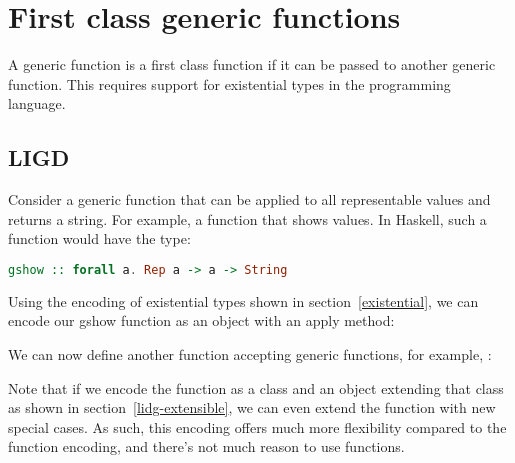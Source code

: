 \section{First class generic functions}

A generic function is a first class function if it can be passed to another
generic function. This requires support for existential types in the programming
language.

\subsection{LIGD}

Consider a generic function that can be applied to all representable values
and returns a string. For example, a function  that shows values.
In Haskell, such a function would have the type:
\begin{lstlisting}[language=Haskell]
gshow :: forall a. Rep a -> a -> String
\end{lstlisting}

Using the encoding of existential types shown in section~\ref{existential},
we can encode our gshow function as an object with an apply method:

We can now define another function accepting generic functions, for example, :


Note that if we encode the function as a class and an object extending that
class as shown in section~\ref{lidg-extensible}, we can even extend the
function with new special cases. As such, this encoding offers much more
flexibility compared to the function encoding, and there's not much reason
to use functions.
